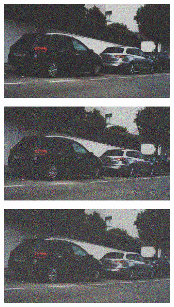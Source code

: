 \documentclass[a4paper]{ctexart}
\begin{document}
\begin{figure}[htbp]
\begin{subfigure}{0.08\textwidth}
			\label{fig：Gamma=0.2, Gauss Noise = 0.4}
		\end{subfigure}
		\begin{subfigure}{0.08\textwidth}
			\captionsetup{font=scriptsize}
			\includegraphics[width=\linewidth]{picture/Edge Detection/degrade/RGB_001 Gamma=0.2, Gauss Noise=0.5}
			\label{fig：Gamma=0.2, Gauss Noise = 0.5}
		\end{subfigure}
		\begin{subfigure}{0.08\textwidth}
			\captionsetup{font=scriptsize}
			\includegraphics[width=\linewidth]{picture/Edge Detection/degrade/RGB_001 Gamma=0.2, Gauss Noise=0.6}
			\label{fig：Gamma=0.2, Gauss Noise = 0.6}
		\end{subfigure}
		\begin{subfigure}{0.08\textwidth}
			\captionsetup{font=scriptsize}
			\includegraphics[width=\linewidth]{picture/Edge Detection/degrade/RGB_001 Gamma=0.2, Gauss Noise=0.7}

\end{subfigure}
\end{figure}
\end{document}
